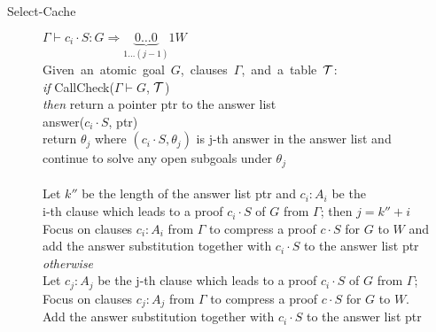\documentclass{llncs}
\newcommand{\fighead}{\hrule\vspace{1.5ex}}
\newcommand{\vd}{\vdash}
\begin{document}
\begin{center}
\begin{small}
\begin{description}
\item[Select-Cache] $\Gamma \vd c_i \cdot S: G \Rightarrow
  \underset{1 \ldots (j-1)}{\underbrace{0\ldots 0}}1W $ \\
    \mbox{Given an atomic goal $G$, clauses $\Gamma$, and a table $\cal{T}$:}\hfill
\\
    {\em{if}} CallCheck($\Gamma \vd G$, $\cal{T}$) \\
         {\em{then}} return a pointer ptr to the answer list\\
         answer($c_i \cdot S$, ptr) \\
         return $\theta_j$ where $(c_i \cdot S,
        \theta_j)$ is j-th answer in the answer list and \\
        \hspace{1.5cm}continue to solve any open subgoals under
         $\theta_j$ \\
         \hspace{0.75cm}{\em otherwise}\\
         \hspace{1cm}Let  $k''$ be the length of the answer list ptr
         and $c_i : A_i$  be the\\
         \hspace{1cm} i-th clause which leads to a
         proof $c_i\cdot S$ of $G$ from 
         $\Gamma$; then $j = k'' + i$\\
         \hspace{1cm}Focus on clauses $c_i : A_i$ from $\Gamma$ to compress 
         a proof $c\cdot S$ for $G$ to $W$ and \\
         \hspace{1cm}add the answer substitution together with
         $c_i\cdot S$ to the answer list ptr\\ 
      {\em otherwise} \\
\hspace{0.5cm}Let  $c_j : A_j$ be the j-th clause which leads to a 
         proof $c_i\cdot S$ of $G$ from $\Gamma$;\\
\hspace{0.5cm}Focus on clauses $c_j : A_j$ from $\Gamma$ to compress 
a proof $c\cdot S$ for $G$ to $W$.\\
     \hspace{0.5cm}Add the answer substitution together with
         $c_i\cdot S$ to the answer list ptr\\[1em]


\end{description}
\end{small}
\end{center}
\end{document}
